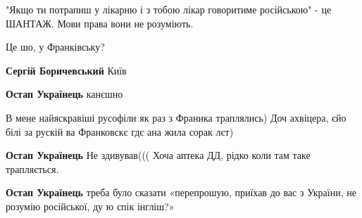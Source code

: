 \begin{itemize}
"Якщо ти потрапиш у лікарню і з тобою лікар говоритиме російською" - це ШАНТАЖ. Мови права вони не розуміють.

 
Це шо, у Франківську?

\begin{itemize}
 
\textbf{Сергій Боричевський} Київ

 
\textbf{Остап Українець} канєшно

 
В мене найяскравіші русофіли як раз з Франика траплялись) Доч ахвіцера, єйо білі за рускій ва Франковскє гдє ана жила сорак лєт)

 
\textbf{Остап Українець} Не здивував((( Хоча аптека ДД, рідко коли там таке трапляється.

 
\textbf{Остап Українець} треба було сказати «перепрошую, приїхав до вас з України, не розумію російської, ду ю спік інгліш?»


\end{itemize}
\end{itemize}
